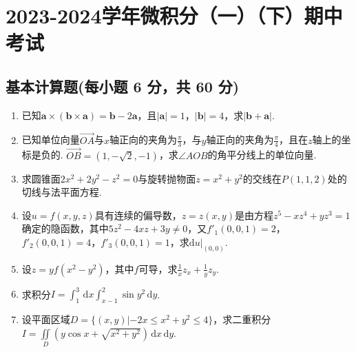 \documentclass[../Main.tex]{subfiles}
\begin{document}
\chapter{2023-2024学年微积分（一）（下）期中考试}

\section{基本计算题(每小题 6 分，共 60 分)}
\begin{enumerate}
    \item 已知$\boldsymbol{a}\times (\boldsymbol{b}\times \boldsymbol{a}) = \boldsymbol
              {b}-2\boldsymbol{a}$，且$|\boldsymbol{a}|=1$，$|\boldsymbol{b}|=4$，求$|\boldsymbol
              {b}+\boldsymbol{a}|$.
          \vspace{10em}

    \item 已知单位向量$\overrightarrow{OA}$与$x$轴正向的夹角为$\frac{\pi}{3}$，与$y$轴正向的夹角为$\frac{\pi}{4}$，且在$z$轴上的坐标是负的.
          $\overrightarrow{OB}=\left(1,-\sqrt{2},-1\right)$，求$\angle AOB$的角平分线上的单位向量.
          \vspace{12em}

    \item 求圆锥面$2x^{2}+2y^{2}-z^{2}=0$与旋转抛物面$z=x^{2}+y^{2}$的交线在$P(1,
              1,2)$处的切线与法平面方程.
          \vspace{12em}

    \item 设$u=f(x,y,z)$具有连续的偏导数，$z=z(x,y)$是由方程$z^{5}-xz^{4}+yz^{3}=
              1$确定的隐函数，其中$5z^{2}-4xz+3y\neq0$，又$f'_{1}(0,0,1)=2$，$f'_{2}(0,0,
              1)=4$，$f'_{3}(0,0,1)=1$，求$\left.\mathrm{d}u\right|_{(0,0)}$.
          \vspace{12em}

    \item 设$z=yf(x^{2}-y^{2})$，其中$f$可导，求$\frac{1}{x}z_{x}+\frac{1}{y}z_{y}$.
          \vspace{12em}

    \item 求积分$I=\int_{1}^{3}\,\mathrm{d}x\int_{x-1}^{2}\sin y^{2}\,\mathrm{d}y$.
          \vspace{12em}

    \item 设平面区域$D=\{(x,y)|-2x\leq x^{2}+y^{2}\leq 4\}$，求二重积分$I=\iint\limits
              _{D}\left(y\cos x+\sqrt{x^{2}+y^{2}}\right)\,\mathrm{d}x\,\mathrm{d}y$.
          \vspace{12em}


\end{enumerate}
\end{document}
